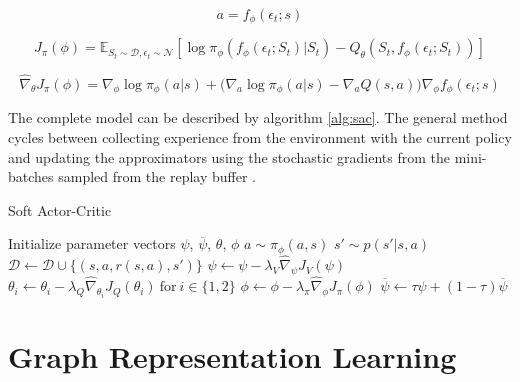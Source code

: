 \begin{equation} \label{eq:sac-pol-reparam}
	a = f_\phi (\epsilon_t; s)
\end{equation}

\begin{equation} \label{eq:sac-pi-loss}
	J_\pi (\phi) = \mathbb{E}_{S_t \sim \mathcal{D}, \epsilon_t \sim \mathcal{N}} \left[ \log \pi_\phi (f_\phi (\epsilon_t; S_t)| S_t) - Q_\theta (S_t, f_\phi(\epsilon_t; S_t)) \right]
\end{equation}

\begin{equation} \label{eq:sac-pi-loss-grad}
	\hat{\nabla}_\theta J_\pi (\phi) = \nabla_\phi \log \pi_\phi (a | s) + \Big( \nabla_{a}  \log \pi_\phi (a|s) - \nabla_{a} Q (s, a)) \nabla_\phi f_\phi (\epsilon_t; s)
\end{equation}

The complete model can be described by algorithm \ref{alg:sac}. The general method cycles between collecting experience from the environment with the current policy and updating the approximators using the stochastic gradients from the mini-batches sampled from the replay buffer \cite{haarnojaSoftActorCriticOffPolicy2018}. \par

\begin{algorithm}
	\caption{Soft Actor-Critic}
	\label{alg:sac}
	\begin{algorithmic}
		\State Initialize parameter vectors $\psi$, $\overline{\psi}$, $\theta$, $\phi$
				\State $a \sim \pi_\phi (a, s)$
				\State $s' \sim p(s'|s, a)$
				\State $\mathcal{D} \leftarrow \mathcal{D} \cup \{(s, a, r(s, a), s')\}$
			\EndFor
				\State $\psi \leftarrow \psi - \lambda_V \hat{\nabla}_\psi J_V (\psi) $
				\State $\theta_i \leftarrow \theta_i - \lambda_Q \hat{\nabla}_{\theta_i} J_Q (\theta_i)\ \text{for}\ i \in \{1,2\}$
				\State $\phi \leftarrow \phi - \lambda_\pi \hat{\nabla}_\phi J_\pi (\phi)$
				\State $\overline{\psi} \leftarrow \tau \psi + (1 - \tau) \overline{\psi}$
			\EndFor
		\EndFor
	\end{algorithmic}
\end{algorithm}

\section{Graph Representation Learning} \label{sec:back-grl}

